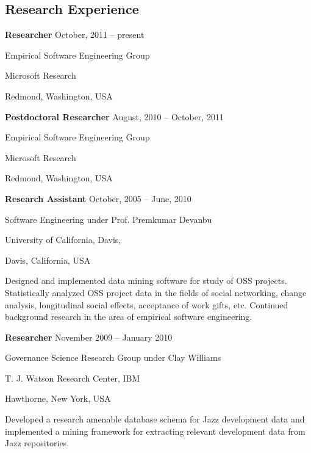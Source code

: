 \documentclass[margin,line,article,letterpaper]{res}
\newenvironment{list1}{
  \begin{list}{}{%
      \setlength{\itemsep}{0in}
      \setlength{\parsep}{0in} \setlength{\parskip}{0in}
      \setlength{\topsep}{0in} \setlength{\partopsep}{0in} 
      \setlength{\leftmargin}{0.17in}}}{\end{list}}
\newcommand{\timespan}[1]{#1}
\begin{document}
\begin{resume}
\section{Research Experience}

\textbf{Researcher} \hfill \timespan{October, 2011 -- present}\\
\vspace{-10pt}
\begin{list1}
\item Empirical Software Engineering Group
\item Microsoft Research
\item Redmond, Washington, USA
\vspace{6pt}
\item  
\end{list1}


\textbf{Postdoctoral Researcher} \hfill \timespan{August, 2010 -- October, 2011}\\
\vspace{-10pt}
\begin{list1}
\item Empirical Software Engineering Group
\item Microsoft Research
\item Redmond, Washington, USA
\vspace{6pt}
\item  
\end{list1}

\textbf{Research Assistant} \hfill \timespan{October, 2005 -- June, 2010}\\
\vspace{-10pt}
\begin{list1}
\item Software Engineering under Prof. Premkumar Devanbu
\item University of California, Davis,
\item Davis, California, USA
\vspace{6pt}
\item Designed and implemented data mining software for study of OSS projects. Statistically 
analyzed OSS project data in the fields of social networking, change analysis, 
longitudinal social effects, acceptance of work gifts, etc. Continued background research in the 
area of empirical software engineering.
\end{list1}

\textbf{Researcher} \hfill \timespan{November 2009 -- January 2010}\\
\vspace{-10pt}
\begin{list1}
\item Governance Science Research Group under Clay Williams
\item T. J. Watson Research Center, IBM
\item Hawthorne, New York, USA
\vspace{6pt}
\item Developed a research amenable database schema for Jazz development
    data and implemented a mining framework for extracting relevant development
    data from Jazz repositories.
\end{list1}



\end{resume}
\end{document}
